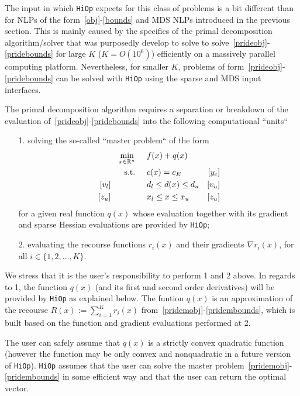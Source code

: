 \documentclass[11pt]{article}
\newcommand{\Hi}{\texttt{HiOp}\xspace}
\begin{document}
The input in which \Hi expects for this class of problems is a bit different than for NLPs of the form~\eqref{obj}-\eqref{bounds} and MDS NLPs introduced in the previous section. This is mainly caused by the specifics of the primal decomposition algorithm/solver that was purposedly develop to solve to solve~\eqref{prideobj}-\eqref{pridebounds} for large $K$ ($K=O(10^6)$) efficiently on a massively parallel computing platform. Nevertheless, for smaller $K$, problems of form~\eqref{prideobj}-\eqref{pridebounds} can be solved with \Hi using the sparse and MDS input interfaces.

The primal decomposition algorithm requires a separation or breakdown of the evaluation of~\eqref{prideobj}-\eqref{pridebounds} into the following computational ``units``
\begin{itemize}
\item[1.] solving the so-called ``master problem`` of the form
  \begin{align}
&&&&\min_{x\in\mathbb{R}^n} & \hspace{0.5cm} f(x) + q(x) &&&& \label{pridemobj}\\
&&&&\textnormal{s.t.} &\hspace{0.5cm}  c(x)=c_E &[y_c]&&&\\
&&[v_l]&&& \hspace{0.5cm} d_l \leq d(x) \leq d_u  &[v_u]&&&\label{pridemineq} \\
&&[z_u]&&& \hspace{0.5cm} x_l \leq x \leq x_u & [z_u] &&&\label{pridembounds}
  \end{align}
for a given real function $q(x)$ whose evaluation together with its gradient and sparse Hessian evaluations are provided by \Hi;
\item[2.] evaluating the recourse functions $r_i(x)$ and their gradients $\nabla r_i(x)$, for all $i\in\{1,2,\ldots, K\}$.
\end{itemize}
We stress that it is the user's responsibility to perform 1 and 2 above. In regards to 1, the function $q(x)$ (and its first and second order derivatives) will be provided by \Hi as explained below. The funtion $q(x)$ is an approximation of the recourse $R(x):=\sum_{i=1}^K r_i(x)$ from~\eqref{pridemobj}-\eqref{pridembounds}, which is built based on the function and gradient evaluations performed at 2.

The user can safely assume that $q(x)$ is a strictly  convex quadratic function (however the function may be only convex and nonquadratic in a future version of \Hi). \Hi assumes that the user can solve the master problem~\eqref{pridemobj}-\eqref{pridembounds} in some efficient way and that the user can return the optimal vector.
\end{document}
